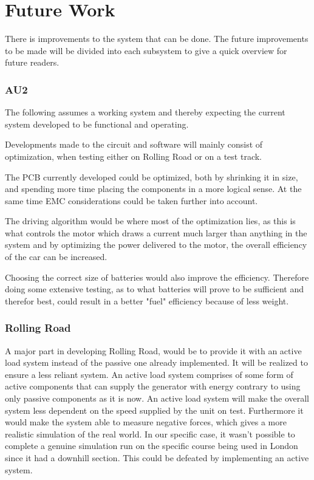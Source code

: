 \chapter {Future Work}
There is improvements to the system that can be done. The future improvements to be made will be divided into each subsystem to give a quick overview for future readers. 

\subsection*{AU2}
The following assumes a working system and thereby expecting the current system developed to be functional and operating.

Developments made to the circuit and software will mainly consist of optimization, when testing either on Rolling Road or on a test track. 

The PCB currently developed could be optimized, both by shrinking it in size, and spending more time placing the components in a more logical sense. At the same time EMC considerations could be taken further into account. 

The driving algorithm would be where most of the optimization lies, as this is what controls the motor which draws a current much larger than anything in the system and by optimizing the power delivered to the motor, the overall efficiency of the car can be increased. 

Choosing the correct size of batteries would also improve the efficiency. Therefore doing some extensive testing, as to what batteries will prove to be sufficient and therefor best, could result in a better "fuel" efficiency because of less weight. 

\subsection*{Rolling Road}
A major part in developing Rolling Road, would be to provide it with an active load system instead of the passive one already implemented. It will be realized to ensure a less reliant system. An active load system comprises of some form of active components that can supply the generator with energy contrary to using only passive components as it is now. An active load system will make the overall system less dependent on the speed supplied by the unit on test. Furthermore it would make the system able to measure negative forces, which gives a more realistic simulation of the real world. In our specific case, it wasn't possible to complete a  genuine simulation run on the specific course being used in London since it had a downhill section. This could be defeated by implementing an active system. 

